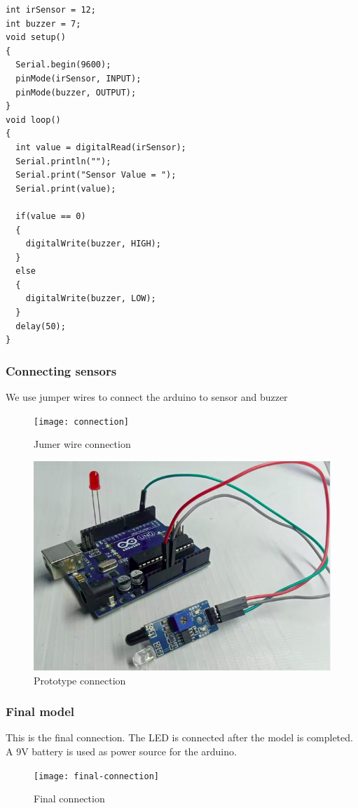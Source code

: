 \documentclass[conference]{IEEEtran}
\begin{document}
    \begin{verbatim}
int irSensor = 12;
int buzzer = 7;
void setup()
{
  Serial.begin(9600);
  pinMode(irSensor, INPUT);
  pinMode(buzzer, OUTPUT);
}
void loop()
{
  int value = digitalRead(irSensor);
  Serial.println("");
  Serial.print("Sensor Value = ");
  Serial.print(value);

  if(value == 0)
  {
    digitalWrite(buzzer, HIGH);
  }
  else
  {
    digitalWrite(buzzer, LOW);
  }
  delay(50);
}
    \end{verbatim}
    \subsubsection{Connecting sensors}
    We use jumper wires to connect the arduino to sensor and buzzer
    \begin{figure}[htbp]
        \centerline{\texttt{[image: connection]}}
        \caption{Jumer wire connection}
        \label{fig}
    \end{figure}

    \begin{figure}[htbp]
        \centerline{\includegraphics[scale=0.35]{fig2}}
        \caption{Prototype connection}
        \label{fig}
    \end{figure}


    \subsubsection{Final model}

    This is the final connection. The LED is connected after the model is completed.
    A 9V battery is used as power source for the arduino.
    \begin{figure}[htbp]
        \centerline{\texttt{[image: final-connection]}}
        \caption{Final connection}
        \label{fig}
    \end{figure}
\end{document}
